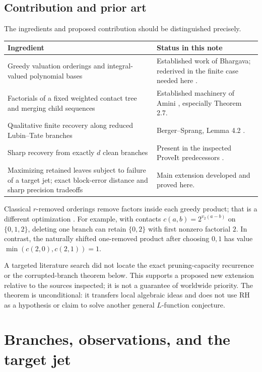 \documentclass[11pt]{article}
\theoremstyle{definition}
\begin{document}
\subsection{Contribution and prior art}

The ingredients and proposed contribution should be distinguished precisely.
\begin{center}
\small
\begin{tabular}{@{}p{.43\linewidth}p{.51\linewidth}@{}}
\toprule
Ingredient & Status in this note\\
\midrule
Greedy valuation orderings and integral-valued polynomial bases & Established work of Bhargava; rederived in the finite case needed here \cite{bhargava97,bhargava09}.\\[4pt]
Factorials of a fixed weighted contact tree and merging child sequences & Established machinery of Amini \cite{amini}, especially Theorem 2.7.\\[4pt]
Qualitative finite recovery along reduced Lubin--Tate branches & Berger--Sprang, Lemma 4.2 \cite{bergersprang}.\\[4pt]
Sharp recovery from exactly $d$ clean branches & Present in the inspected ProveIt predecessors \cite{priorbranches,priorlt}.\\[4pt]
Maximizing retained leaves subject to failure of a target jet; exact block-error distance and sharp precision tradeoffs & Main extension developed and proved here.\\
\bottomrule
\end{tabular}
\end{center}

Classical $r$-removed orderings remove factors inside each greedy product; that is a different optimization \cite{johnson,krachun}. For example, with contacts $c(a,b)=2^{v_2(a-b)}$ on $\{0,1,2\}$, deleting one branch can retain $\{0,2\}$ with first nonzero factorial $2$. In contrast, the naturally shifted one-removed product after choosing $0,1$ has value $\min(c(2,0),c(2,1))=1$.

A targeted literature search did not locate the exact pruning-capacity recurrence or the corrupted-branch theorem below. This supports a proposed new extension relative to the sources inspected; it is not a guarantee of worldwide priority. The theorem is unconditional: it transfers local algebraic ideas and does not use RH as a hypothesis or claim to solve another general $L$-function conjecture.

\section{Branches, observations, and the target jet}\label{sec:setup}
\end{document}
